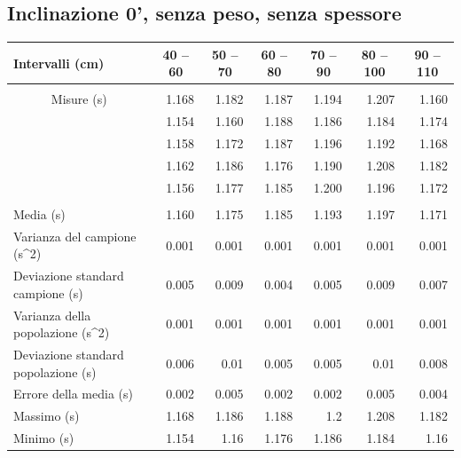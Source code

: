 \documentclass[12pt]{article} %
\begin{document}
	\subsection {Inclinazione 0', senza peso, senza spessore}
		\begin{table}[H]
		\begin{tabular}{|l|r|r|r|r|r|r|}
		\hline
		Intervalli (cm) & \multicolumn{1}{c|}{40 – 60} & \multicolumn{1}{c|}{50 – 70} & \multicolumn{1}{c|}{60 – 80} & \multicolumn{1}{c|}{70 – 90} & \multicolumn{1}{c|}{80 – 100} & \multicolumn{1}{c|}{90 – 110} \\ \hline
		 & \multicolumn{ 6}{l|}{} \\ \hline
		\multicolumn{ 1}{|c|}{Misure (s)} & 1.168 & 1.182 & 1.187 & 1.194 & 1.207 & 1.160 \\ \cline{ 2- 7}
		\multicolumn{ 1}{|l|}{} & 1.154 & 1.160 & 1.188 & 1.186 & 1.184 & 1.174 \\ \cline{ 2- 7}
		\multicolumn{ 1}{|l|}{} & 1.158 & 1.172 & 1.187 & 1.196 & 1.192 & 1.168 \\ \cline{ 2- 7}
		\multicolumn{ 1}{|l|}{} & 1.162 & 1.186 & 1.176 & 1.190 & 1.208 & 1.182 \\ \cline{ 2- 7}
		\multicolumn{ 1}{|l|}{} & 1.156 & 1.177 & 1.185 & 1.200 & 1.196 & 1.172 \\ \hline
		 & \multicolumn{ 6}{c|}{} \\ \hline
		Media (s) & 1.160 & 1.175 & 1.185 & 1.193 & 1.197 & 1.171 \\ \hline
		Varianza del campione (s^2) & 0.001 & 0.001 & 0.001 & 0.001 & 0.001 & 0.001 \\ \hline
		Deviazione standard campione (s) & 0.005 & 0.009 & 0.004 & 0.005 & 0.009 & 0.007 \\ \hline
		Varianza della popolazione (s^2) & 0.001 & 0.001 & 0.001 & 0.001 & 0.001 & 0.001 \\ \hline
		Deviazione standard popolazione (s) & 0.006 & 0.01 & 0.005 & 0.005 & 0.01 & 0.008 \\ \hline
		Errore della media (s) & 0.002 & 0.005 & 0.002 & 0.002 & 0.005 & 0.004 \\ \hline
		Massimo (s) & 1.168 & 1.186 & 1.188 & 1.2 & 1.208 & 1.182 \\ \hline
		Minimo (s) & 1.154 & 1.16 & 1.176 & 1.186 & 1.184 & 1.16 \\ \hline
		\end{tabular}

		\label{0n}
		\end{table}
	
\end{document}
